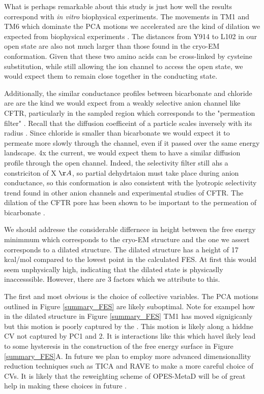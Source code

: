 What is perhaps remarkable about this study is just how well the results correspond with \textit{in vitro} biophysical experiments. The movements in TM1 and TM6 which dominate the PCA motions we accelerated are the kind of dilation we expected from biophysical experiments \cite{linsdell2016}. The distances from Y914 to L102 in our open state are also not much larger than those found in the cryo-EM conformation. Given that these two amino acids can be cross-linked by cysteine substitution, while still allowing the ion channel to access the open state, we would expect them to remain close together in the conducting state\cite{negoda2019}. 

Additionally, the similar conductance profiles between bicarbonate and chloride are are the kind we would expect from a weakly selective anion channel like CFTR, particularly in the sampled region which corresponds to the "permeation filter" \cite{}. Recall that the diffusion coefficeint of a particle scales inversely with its radius \cite{}. Since chloride is smaller than bicarbonate we would expect it to permeate more slowly through the channel, even if it passed over the same energy landscape. 4x the current, we would expect them to have a similar diffusion profile through the open channel. Indeed, the selectivity filter still ahs a constriciton of X $\AA$, so partial dehydrtaion must take place during anion conductance, so this conformation is also consistent with the lyotropic selectivity trend found in other anion channels and experimental studies of CFTR. The dilation of the CFTR pore has been shown to be important to the permeation of bicarbonate \cite{jun2016}.

We should addresse the considerable differnece in height between the  free energy minimmum which corresponds to the cryo-EM structure and the one we assert corresponds to a dilated structure. The dilated structure has a height of 17 kcal/mol compared to the lowest point in the calculated FES. At first this would seem unphysically high, indicating that the dilated state is physicaslly inaccesssible. However, there are 3 factors which we attribute to this. 

The first and most obvious is the choice of collective variables. The PCA motions outlined in Figure \ref{summary_FES} are likely suboptimal. Note for exampel how in the dilated structure in Figure \ref{summary_FES} TM1 has moved signigicanly but this motion is poorly captured by the . This motion is likely along a hiddne CV  not captured by PC1 and 2. It is interactions like this which havel ikely lead to some hysteresis in the construction of the free energy surface in Figure \ref{summary_FES}A. In future we plan to employ more advanced dimensionallity reduction techniques such as TICA and RAVE \cite{} to make a more careful choice of CVs. It is likely that the reweighting scheme of OPES-MetaD will be of great help in making these choices in future \cite{}. 


